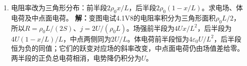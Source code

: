\documentclass[UTF8,fontset=fandol,a4paper,11pt]{ctexart}
\begin{document}
\begin{enumerate}
\item 电阻率改为三角形分布：前半段$2\rho_0x/L$，后半段$2\rho_0(1-x/L)$。求电场、体电荷及中点面电荷。
\textbf{解：}变图电试4.1V8的电阻率积分为三角形面积$\rho_0L/2$，所以$R=\rho_0L/(2S)$、$j=2U/(\rho_0L)$。场强前半段为$4Ux/L^2$，后半段为$4U(1-x/L)/L$，中点两侧同为$2U/L$。体电荷前半段恒为$4\varepsilon_0U/L^2$，后半段恒为负的同值；它们的跃变对应场的斜率改变，中点面电荷仍由场值差给零。两半段的正负总电荷相消，电势降仍积分为$U$。
\begin{center}\begin{minipage}{.98\linewidth}\centering
{}
\end{minipage}
\end{center}
\end{enumerate}
\end{document}
